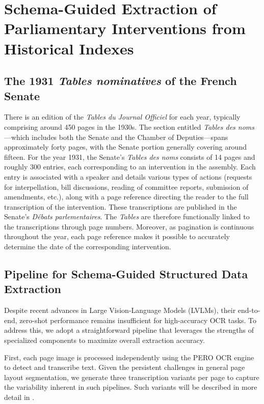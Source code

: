 \section{Schema-Guided Extraction of Parliamentary Interventions from Historical Indexes}
\label{sec:documents-approach}

\subsection{The 1931 \textit{Tables nominatives} of the French Senate}
There is an edition of the \textit{Tables du Journal Officiel} for each year, typically comprising around 450 pages in the 1930s. The section entitled \textit{Tables des noms}—which includes both the Senate and the Chamber of Deputies—spans approximately forty pages, with the Senate portion generally covering around fifteen. For the year 1931, the Senate's \textit{Tables des noms} consists of 14 pages and roughly 300 entries, each corresponding to an intervention in the assembly.
Each entry is associated with a speaker and details various types of actions (requests for interpellation, bill discussions, reading of committee reports, submission of amendments, etc.), along with a page reference directing the reader to the full transcription of the intervention. These transcriptions are published in the Senate's \textit{Débats parlementaires}. The \textit{Tables} are therefore functionally linked to the transcriptions through page numbers. Moreover, as pagination is continuous throughout the year, each page reference makes it possible to accurately determine the date of the corresponding intervention.




\subsection{Pipeline for Schema-Guided Structured Data Extraction}

Despite recent advances in Large Vision-Language Models (LVLMs), their end-to-end, zero-shot performance remains insufficient for high-accuracy OCR tasks. To address this, we adopt a straightforward pipeline that leverages the strengths of specialized components to maximize overall extraction accuracy.

First, each page image is processed independently using the PERO OCR engine~\cite{kodym2021layout,kis2021atst,kohut2021tsnet} to detect and transcribe text. Given the persistent challenges in general page layout segmentation, we generate three transcription variants per page to capture the variability inherent in such pipelines. Such variants will be described in more detail in .

